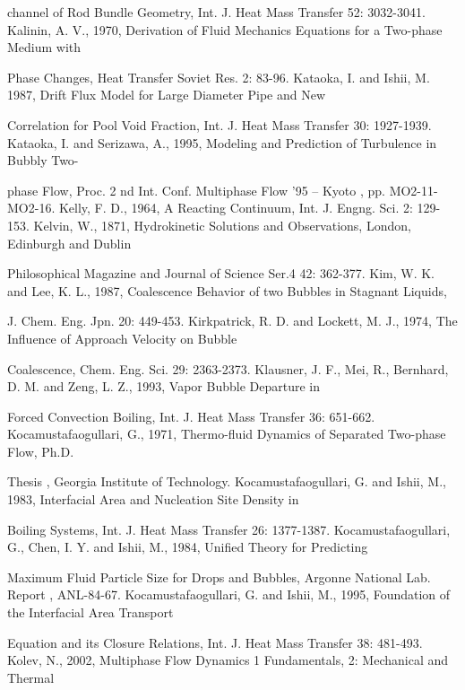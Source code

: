 \documentclass[11pt,a4paper,openany,fontset=none]{ctexbook}
\begin{document}
{\small\raggedright\noindent channel of Rod Bundle Geometry, Int. J. Heat Mass Transfer 52: 3032-3041. Kalinin, A. V., 1970, Derivation of Fluid Mechanics Equations for a Two-phase Medium with\par}
{\small\raggedright\noindent Phase Changes, Heat Transfer Soviet Res. 2: 83-96. Kataoka, I. and Ishii, M. 1987, Drift Flux Model for Large Diameter Pipe and New\par}
{\small\raggedright\noindent Correlation for Pool Void Fraction, Int. J. Heat Mass Transfer 30: 1927-1939. Kataoka, I. and Serizawa, A., 1995, Modeling and Prediction of Turbulence in Bubbly Two-\par}
{\small\raggedright\noindent phase Flow, Proc. 2 nd Int. Conf. Multiphase Flow ’95 – Kyoto , pp. MO2-11-MO2-16. Kelly, F. D., 1964, A Reacting Continuum, Int. J. Engng. Sci. 2: 129-153. Kelvin, W., 1871, Hydrokinetic Solutions and Observations, London, Edinburgh and Dublin\par}
{\small\raggedright\noindent Philosophical Magazine and Journal of Science Ser.4 42: 362-377. Kim, W. K. and Lee, K. L., 1987, Coalescence Behavior of two Bubbles in Stagnant Liquids,\par}
{\small\raggedright\noindent J. Chem. Eng. Jpn. 20: 449-453. Kirkpatrick, R. D. and Lockett, M. J., 1974, The Influence of Approach Velocity on Bubble\par}
{\small\raggedright\noindent Coalescence, Chem. Eng. Sci. 29: 2363-2373. Klausner, J. F., Mei, R., Bernhard, D. M. and Zeng, L. Z., 1993, Vapor Bubble Departure in\par}
{\small\raggedright\noindent Forced Convection Boiling, Int. J. Heat Mass Transfer 36: 651-662. Kocamustafaogullari, G., 1971, Thermo-fluid Dynamics of Separated Two-phase Flow, Ph.D.\par}
{\small\raggedright\noindent Thesis , Georgia Institute of Technology. Kocamustafaogullari, G. and Ishii, M., 1983, Interfacial Area and Nucleation Site Density in\par}
{\small\raggedright\noindent Boiling Systems, Int. J. Heat Mass Transfer 26: 1377-1387. Kocamustafaogullari, G., Chen, I. Y. and Ishii, M., 1984, Unified Theory for Predicting\par}
{\small\raggedright\noindent Maximum Fluid Particle Size for Drops and Bubbles, Argonne National Lab. Report , ANL-84-67. Kocamustafaogullari, G. and Ishii, M., 1995, Foundation of the Interfacial Area Transport\par}
{\small\raggedright\noindent Equation and its Closure Relations, Int. J. Heat Mass Transfer 38: 481-493. Kolev, N., 2002, Multiphase Flow Dynamics 1 Fundamentals, 2: Mechanical and Thermal\par}
\end{document}
